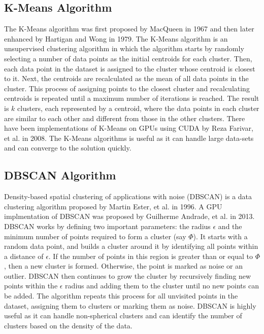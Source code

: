 \documentclass[acmlarge,noacm]{acmart}
\begin{document}
\subsection{K-Means Algorithm}

The K-Means algorithm was first proposed by MacQueen in 1967 \cite{macqueen1967classification} and then later enhanced by Hartigan and Wong \cite{hartigan1979k} in 1979. The K-Means algorithm is an unsupervised clustering algorithm in which the algorithm starts by randomly selecting a number of data points as the initial centroids for each cluster. Then, each data point in the dataset is assigned to the cluster whose centroid is closest to it. Next, the centroids are recalculated as the mean of all data points in the cluster. This process of assigning points to the closest cluster and recalculating centroids is repeated until a maximum number of iterations is reached. The result is $k$ clusters, each represented by a centroid, where the data points in each cluster are similar to each other and different from those in the other clusters. There have been implementations of K-Means on GPUs using CUDA by Reza Farivar, et al. \cite{farivar2008parallel} in 2008. The K-Means algorithms is useful as it can handle large data-sets and can converge to the solution quickly.  

\subsection{DBSCAN Algorithm}
Density-based spatial clustering of applications with noise (DBSCAN) is a data clustering algorithm proposed by Martin Ester, et al. \cite{10.5555/3001460.3001507} in 1996. A GPU implmentation of DBSCAN was proposed by Guilherme Andrade, et al. \cite{andrade2013g} in 2013. DBSCAN works by defining two important parameters: the radius $\epsilon$ and the minimum number of points required to form a cluster (say $\Phi$). It starts with a random data point, and builds a cluster around it by identifying all points within a distance of  $\epsilon$. If the number of points in this region is greater than or equal to $\Phi$, then a new cluster is formed. Otherwise, the point is marked as noise or an outlier. DBSCAN then continues to grow the cluster by recursively finding new points within the $\epsilon$ radius and adding them to the cluster until no new points can be added. The algorithm repeats this process for all unvisited points in the dataset, assigning them to clusters or marking them as noise. DBSCAN is highly useful as it can handle non-spherical clusters and can identify the number of clusters based on the density of the data.
\end{document}
